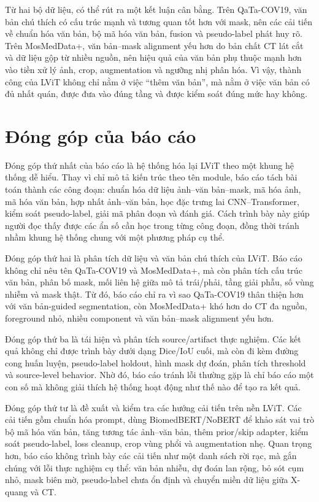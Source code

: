 Từ hai bộ dữ liệu, có thể rút ra một kết luận cân bằng. Trên QaTa-COV19, văn bản chú thích có cấu trúc mạnh và tương quan tốt hơn với mask, nên các cải tiến về chuẩn hóa văn bản, bộ mã hóa văn bản, fusion và pseudo-label phát huy rõ. Trên MosMedData+, văn bản--mask alignment yếu hơn do bản chất CT lát cắt và dữ liệu gộp từ nhiều nguồn, nên hiệu quả của văn bản phụ thuộc mạnh hơn vào tiền xử lý ảnh, crop, augmentation và ngưỡng nhị phân hóa. Vì vậy, thành công của LViT không chỉ nằm ở việc ``thêm văn bản'', mà nằm ở việc văn bản có đủ nhất quán, được đưa vào đúng tầng và được kiểm soát đúng mức hay không.

\section{Đóng góp của báo cáo}

Đóng góp thứ nhất của báo cáo là hệ thống hóa lại LViT theo một khung hệ thống dễ hiểu. Thay vì chỉ mô tả kiến trúc theo tên module, báo cáo tách bài toán thành các công đoạn: chuẩn hóa dữ liệu ảnh--văn bản--mask, mã hóa ảnh, mã hóa văn bản, hợp nhất ảnh--văn bản, học đặc trưng lai CNN--Transformer, kiểm soát pseudo-label, giải mã phân đoạn và đánh giá. Cách trình bày này giúp người đọc thấy được các ẩn số cần học trong từng công đoạn, đồng thời tránh nhầm khung hệ thống chung với một phương pháp cụ thể.

Đóng góp thứ hai là phân tích dữ liệu và văn bản chú thích của LViT. Báo cáo không chỉ nêu tên QaTa-COV19 và MosMedData+, mà còn phân tích cấu trúc văn bản, phân bố mask, mối liên hệ giữa mô tả trái/phải, tầng giải phẫu, số vùng nhiễm và mask thật. Từ đó, báo cáo chỉ ra vì sao QaTa-COV19 thân thiện hơn với văn bản-guided segmentation, còn MosMedData+ khó hơn do CT đa nguồn, foreground nhỏ, nhiều component và văn bản--mask alignment yếu hơn.

Đóng góp thứ ba là tái hiện và phân tích source/artifact thực nghiệm. Các kết quả không chỉ được trình bày dưới dạng Dice/IoU cuối, mà còn đi kèm đường cong huấn luyện, pseudo-label holdout, hình mask dự đoán, phân tích threshold và source-level behavior. Nhờ đó, báo cáo tránh lỗi thường gặp là chỉ báo cáo một con số mà không giải thích hệ thống hoạt động như thế nào để tạo ra kết quả.

Đóng góp thứ tư là đề xuất và kiểm tra các hướng cải tiến trên nền LViT. Các cải tiến gồm chuẩn hóa prompt, dùng BiomedBERT/NoBERT để khảo sát vai trò bộ mã hóa văn bản, tăng tương tác ảnh--văn bản, thêm prior/skip adapter, kiểm soát pseudo-label, loss cleanup, crop vùng phổi và augmentation nhẹ. Quan trọng hơn, báo cáo không trình bày các cải tiến như một danh sách rời rạc, mà gắn chúng với lỗi thực nghiệm cụ thể: văn bản nhiễu, dự đoán lan rộng, bỏ sót cụm nhỏ, mask biên mờ, pseudo-label chưa ổn định và chuyển miền dữ liệu giữa X-quang và CT.

